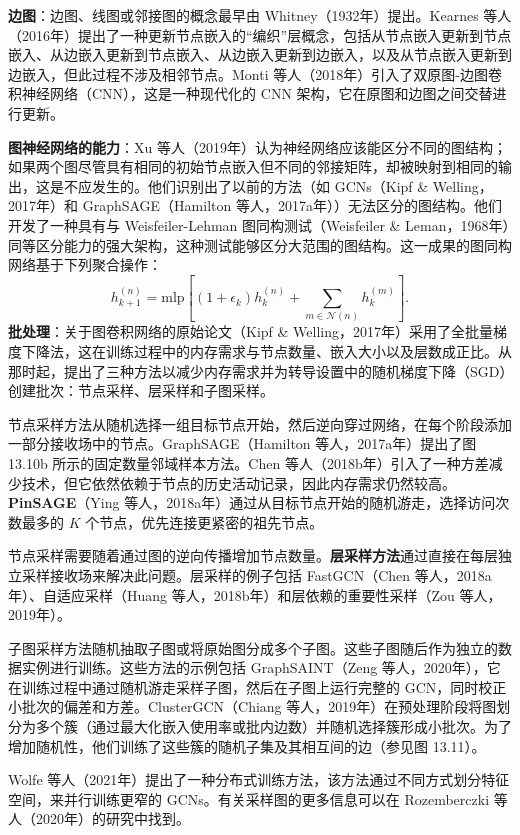 \textbf{边图}：边图、线图或邻接图的概念最早由 Whitney（1932年）提出。Kearnes 等人（2016年）提出了一种更新节点嵌入的“编织”层概念，包括从节点嵌入更新到节点嵌入、从边嵌入更新到节点嵌入、从边嵌入更新到边嵌入，以及从节点嵌入更新到边嵌入，但此过程不涉及相邻节点。Monti 等人（2018年）引入了双原图-边图卷积神经网络（CNN），这是一种现代化的 CNN 架构，它在原图和边图之间交替进行更新。

\textbf{图神经网络的能力}：Xu 等人（2019年）认为神经网络应该能区分不同的图结构；如果两个图尽管具有相同的初始节点嵌入但不同的邻接矩阵，却被映射到相同的输出，这是不应发生的。他们识别出了以前的方法（如 GCNs（Kipf \& Welling，2017年）和 GraphSAGE（Hamilton 等人，2017a年））无法区分的图结构。他们开发了一种具有与 Weisfeiler-Lehman 图同构测试（Weisfeiler \& Leman，1968年）同等区分能力的强大架构，这种测试能够区分大范围的图结构。这一成果的图同构网络基于下列聚合操作：
\begin{equation}
h^{(n)}_{k+1} = \text{mlp} \left[ \left(1 + \epsilon_k\right) h^{(n)}_k + \sum_{m\in\mathcal{N}(n)} h^{(m)}_k \right]. 
\end{equation}
\textbf{批处理}：关于图卷积网络的原始论文（Kipf \& Welling，2017年）采用了全批量梯度下降法，这在训练过程中的内存需求与节点数量、嵌入大小以及层数成正比。从那时起，提出了三种方法以减少内存需求并为转导设置中的随机梯度下降（SGD）创建批次：节点采样、层采样和子图采样。

节点采样方法从随机选择一组目标节点开始，然后逆向穿过网络，在每个阶段添加一部分接收场中的节点。GraphSAGE（Hamilton 等人，2017a年）提出了图 13.10b 所示的固定数量邻域样本方法。Chen 等人（2018b年）引入了一种方差减少技术，但它依然依赖于节点的历史活动记录，因此内存需求仍然较高。\textbf{PinSAGE}（Ying 等人，2018a年）通过从目标节点开始的随机游走，选择访问次数最多的 \(K\) 个节点，优先连接更紧密的祖先节点。

节点采样需要随着通过图的逆向传播增加节点数量。\textbf{层采样方法}通过直接在每层独立采样接收场来解决此问题。层采样的例子包括 FastGCN（Chen 等人，2018a年）、自适应采样（Huang 等人，2018b年）和层依赖的重要性采样（Zou 等人，2019年）。

子图采样方法随机抽取子图或将原始图分成多个子图。这些子图随后作为独立的数据实例进行训练。这些方法的示例包括 GraphSAINT（Zeng 等人，2020年），它在训练过程中通过随机游走采样子图，然后在子图上运行完整的 GCN，同时校正小批次的偏差和方差。ClusterGCN（Chiang 等人，2019年）在预处理阶段将图划分为多个簇（通过最大化嵌入使用率或批内边数）并随机选择簇形成小批次。为了增加随机性，他们训练了这些簇的随机子集及其相互间的边（参见图 13.11）。

Wolfe 等人（2021年）提出了一种分布式训练方法，该方法通过不同方式划分特征空间，来并行训练更窄的 GCNs。有关采样图的更多信息可以在 Rozemberczki 等人（2020年）的研究中找到。

